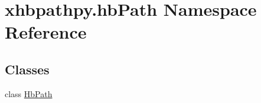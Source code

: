 \hypertarget{namespacexhbpathpy_1_1hb_path}{\section{xhbpathpy.\-hb\-Path Namespace Reference}
\label{namespacexhbpathpy_1_1hb_path}
}
\subsection*{Classes}
\begin{DoxyCompactItemize}
\item 
class \hyperlink{classxhbpathpy_1_1hb_path_1_1_hb_path}{Hb\-Path}
\end{DoxyCompactItemize}
